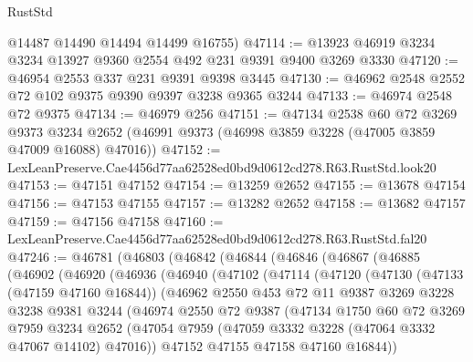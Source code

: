 \begin{lexlean}{RustStd}
\begin{coremodule}
      @14487
      @14490
      @14494
      @14499
      @16755)
@47114 := @13923 @46919 @3234 @3234 @13927 @9360 @2554 @492 @231 @9391 @9400 @3269 @3330
@47120 := @46954 @2553 @337 @231 @9391 @9398 @3445
@47130 := @46962 @2548 @2552 @72 @102 @9375 @9390 @9397 @3238 @9365 @3244
@47133 := @46974 @2548 @72 @9375
@47134 := @46979 @256
@47151 := @47134
    @2538
    @60
    @72
    @3269
    @9373
    @3234
    @2652
    (@46991 @9373 (@46998 @3859 @3228 (@47005 @3859 @47009 @16088) @47016))
@47152 := LexLeanPreserve.Cae4456d77aa62528ed0bd9d0612cd278.R63.RustStd.look20
@47153 := @47151 @47152
@47154 := @13259 @2652
@47155 := @13678 @47154
@47156 := @47153 @47155
@47157 := @13282 @2652
@47158 := @13682 @47157
@47159 := @47156 @47158
@47160 := LexLeanPreserve.Cae4456d77aa62528ed0bd9d0612cd278.R63.RustStd.fal20
@47246 := @46781
    (@46803
      (@46842
        (@46844
          (@46846
            (@46867
              (@46885
                (@46902
                  (@46920
                    (@46936
                      (@46940
                        (@47102
                          (@47114
                            (@47120
                              (@47130
                                (@47133 (@47159 @47160 @16844))
                                (@46962
                                  @2550
                                  @453
                                  @72
                                  @11
                                  @9387
                                  @3269
                                  @3228
                                  @3238
                                  @9381
                                  @3244
                                  (@46974
                                    @2550
                                    @72
                                    @9387
                                    (@47134
                                      @1750
                                      @60
                                      @72
                                      @3269
                                      @7959
                                      @3234
                                      @2652
                                      (@47054
                                        @7959
                                        (@47059 @3332 @3228 (@47064 @3332 @47067 @14102) @47016))
                                      @47152
                                      @47155
                                      @47158
                                      @47160
                                      @16844))

\end{coremodule}
\end{lexlean}
